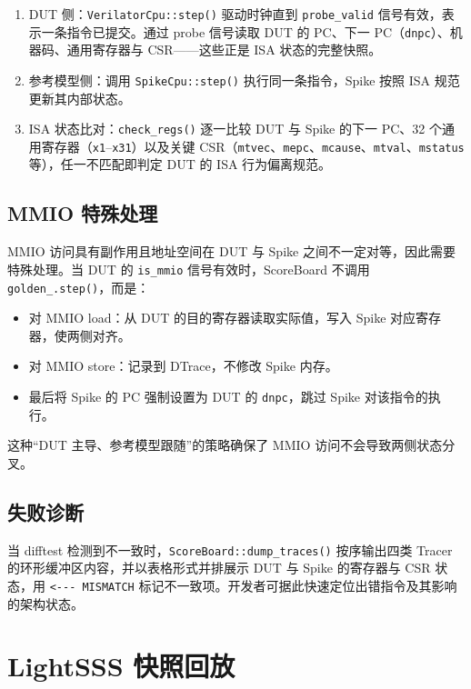 \begin{enumerate}
  \item DUT 侧：\lstinline|VerilatorCpu::step()| 驱动时钟直到 \lstinline|probe_valid| 信号有效，表示一条指令已提交。通过 probe 信号读取 DUT 的 PC、下一 PC（\lstinline|dnpc|）、机器码、通用寄存器与 CSR——这些正是 ISA 状态的完整快照。
  \item 参考模型侧：调用 \lstinline|SpikeCpu::step()| 执行同一条指令，Spike 按照 ISA 规范更新其内部状态。
  \item ISA 状态比对：\lstinline|check_regs()| 逐一比较 DUT 与 Spike 的下一 PC、32 个通用寄存器（\lstinline|x1|--\lstinline|x31|）以及关键 CSR（\lstinline|mtvec|、\lstinline|mepc|、\lstinline|mcause|、\lstinline|mtval|、\lstinline|mstatus| 等），任一不匹配即判定 DUT 的 ISA 行为偏离规范。
\end{enumerate}

\subsection{MMIO 特殊处理}

MMIO 访问具有副作用且地址空间在 DUT 与 Spike 之间不一定对等，因此需要特殊处理。当 DUT 的 \lstinline|is_mmio| 信号有效时，ScoreBoard 不调用 \lstinline|golden_.step()|，而是：

\begin{itemize}
  \item 对 MMIO load：从 DUT 的目的寄存器读取实际值，写入 Spike 对应寄存器，使两侧对齐。
  \item 对 MMIO store：记录到 DTrace，不修改 Spike 内存。
  \item 最后将 Spike 的 PC 强制设置为 DUT 的 \lstinline|dnpc|，跳过 Spike 对该指令的执行。
\end{itemize}

这种“DUT 主导、参考模型跟随”的策略确保了 MMIO 访问不会导致两侧状态分叉。

\subsection{失败诊断}

当 difftest 检测到不一致时，\lstinline|ScoreBoard::dump_traces()| 按序输出四类 Tracer 的环形缓冲区内容，并以表格形式并排展示 DUT 与 Spike 的寄存器与 CSR 状态，用 \lstinline|<--- MISMATCH| 标记不一致项。开发者可据此快速定位出错指令及其影响的架构状态。

\section{LightSSS 快照回放}

